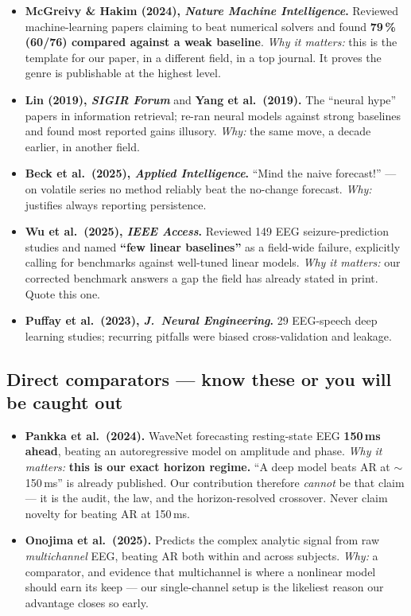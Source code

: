 \documentclass[11pt]{article}
\begin{document}
\begin{itemize}
\item \textbf{McGreivy \& Hakim (2024), \emph{Nature Machine Intelligence}.}
Reviewed machine-learning papers claiming to beat numerical solvers and found
\textbf{79\,\% (60/76) compared against a weak baseline}. \emph{Why it matters:}
this is the template for our paper, in a different field, in a top journal. It
proves the genre is publishable at the highest level.
\item \textbf{Lin (2019), \emph{SIGIR Forum}} and \textbf{Yang et al.\ (2019).}
The ``neural hype'' papers in information retrieval; re-ran neural models against
strong baselines and found most reported gains illusory. \emph{Why:} the same
move, a decade earlier, in another field.
\item \textbf{Beck et al.\ (2025), \emph{Applied Intelligence}.} ``Mind the naive
forecast!'' --- on volatile series no method reliably beat the no-change forecast.
\emph{Why:} justifies always reporting persistence.
\item \textbf{Wu et al.\ (2025), \emph{IEEE Access}.} Reviewed 149 EEG
seizure-prediction studies and named \textbf{``few linear baselines''} as a
field-wide failure, explicitly calling for benchmarks against well-tuned linear
models. \emph{Why it matters:} our corrected benchmark answers a gap the field has
already stated in print. Quote this one.
\item \textbf{Puffay et al.\ (2023), \emph{J.\ Neural Engineering}.} 29 EEG-speech
deep learning studies; recurring pitfalls were biased cross-validation and
leakage.
\end{itemize}

\subsection{Direct comparators --- know these or you will be caught out}

\begin{itemize}
\item \textbf{Pankka et al.\ (2024).} WaveNet forecasting resting-state EEG
\textbf{150\,ms ahead}, beating an autoregressive model on amplitude and phase.
\emph{Why it matters:} \textbf{this is our exact horizon regime.} ``A deep model
beats AR at $\sim$150\,ms'' is already published. Our contribution therefore
\emph{cannot} be that claim --- it is the audit, the law, and the horizon-resolved
crossover. Never claim novelty for beating AR at 150\,ms.
\item \textbf{Onojima et al.\ (2025).} Predicts the complex analytic signal from
raw \emph{multichannel} EEG, beating AR both within and across subjects.
\emph{Why:} a comparator, and evidence that multichannel is where a nonlinear
model should earn its keep --- our single-channel setup is the likeliest reason our
advantage closes so early.
\end{itemize}
\end{document}
